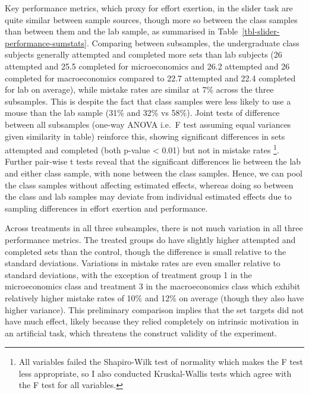 \documentclass[
  12,
  letterpaper,
  DIV=11,
  numbers=noendperiod]{scrartcl}
\begin{document}
Key performance metrics, which proxy for effort exertion, in the slider
task are quite similar between sample sources, though more so between
the class samples than between them and the lab sample, as summarised in
Table~\ref{tbl-slider-performance-sumstats}. Comparing between
subsamples, the undergraduate class subjects generally attempted and
completed more sets than lab subjects (26 attempted and 25.5 completed
for microeconomics and 26.2 attempted and 26 completed for
macroeconomics compared to 22.7 attempted and 22.4 completed for lab on
average), while mistake rates are similar at 7\% across the three
subsamples. This is despite the fact that class samples were less likely
to use a mouse than the lab sample (31\% and 32\% vs 58\%). Joint tests
of difference between all subsamples (one-way ANOVA i.e.~F test assuming
equal variances given similarity in table) reinforce this, showing
significant differences in sets attempted and completed (both p-value
\textless{} 0.01) but not in mistake rates \footnote{All variables
  failed the Shapiro-Wilk test of normality which makes the F test less
  appropriate, so I also conducted Kruskal-Wallis tests which agree with
  the F test for all variables.}. Further pair-wise t tests reveal that
the significant differences lie between the lab and either class sample,
with none between the class samples. Hence, we can pool the class
samples without affecting estimated effects, whereas doing so between
the class and lab samples may deviate from individual estimated effects
due to sampling differences in effort exertion and performance.

Across treatments in all three subsamples, there is not much variation
in all three performance metrics. The treated groups do have slightly
higher attempted and completed sets than the control, though the
difference is small relative to the standard deviations. Variations in
mistake rates are even smaller relative to standard deviations, with the
exception of treatment group 1 in the microeconomics class and treatment
3 in the macroeconomics class which exhibit relatively higher mistake
rates of 10\% and 12\% on average (though they also have higher
variance). This preliminary comparison implies that the set targets did
not have much effect, likely because they relied completely on intrinsic
motivation in an artificial task, which threatens the construct validity
of the experiment.
\end{document}
